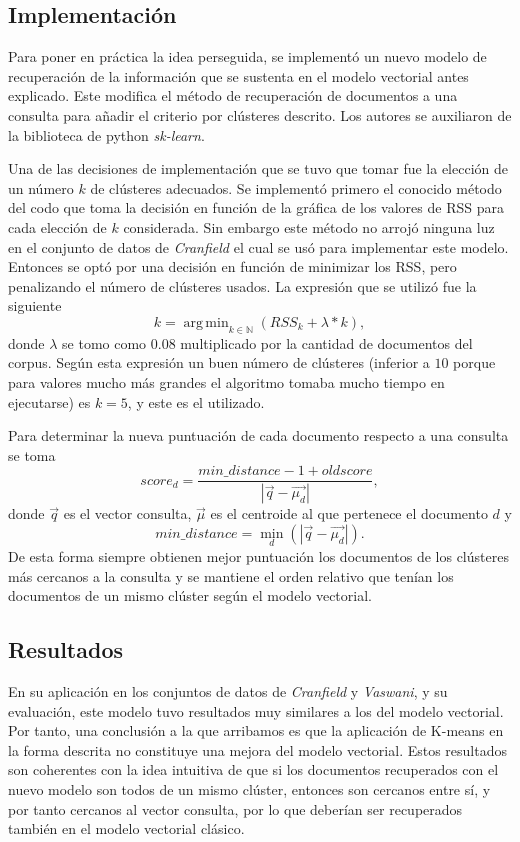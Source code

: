 \documentclass{llncs}
\DeclareMathOperator*{\argmin}{arg\,min}
\begin{document}
	\subsection{Implementaci\'on}
	Para poner en pr\'actica la idea perseguida, se implement\'o un nuevo modelo de recuperaci\'on de la informaci\'on que se sustenta en el modelo vectorial antes explicado. Este modifica el m\'etodo de recuperaci\'on de documentos a una consulta para a\~nadir el criterio por cl\'usteres descrito. Los autores se auxiliaron de la biblioteca de python \emph{sk-learn}.

	 Una de las decisiones de implementaci\'on que se tuvo que tomar fue la elecci\'on de un n\'umero $k$ de cl\'usteres adecuados. Se implement\'o primero el conocido m\'etodo del codo que toma la decisi\'on en funci\'on de la gr\'afica de los valores de RSS para cada elecci\'on de $k$ considerada. Sin embargo este m\'etodo no arroj\'o ninguna luz en el conjunto de datos de \emph{Cranfield} el cual se us\'o para implementar este modelo. Entonces se opt\'o por una decisi\'on en funci\'on de minimizar los RSS, pero penalizando el n\'umero de cl\'usteres usados. La expresi\'on que se utiliz\'o fue la siguiente
	 \[
		k = \argmin_{k \in \mathbb{N}} (RSS_k + \lambda * k),
	 \]
	 donde $\lambda$ se tomo como $0.08$ multiplicado por la cantidad de documentos del corpus. Seg\'un esta expresi\'on un buen n\'umero de cl\'usteres (inferior a $10$ porque para valores mucho m\'as grandes el algoritmo tomaba mucho tiempo en ejecutarse) es $k=5$, y este es el utilizado.
	 
	 Para determinar la nueva puntuaci\'on de cada documento respecto a una consulta se toma 
	 \[score_d =  \frac{min\_distance - 1 + oldscore}{|\overrightarrow{q} - \overrightarrow{\mu_d}|},\]
	 donde $\overrightarrow{q}$ es el vector consulta, $\overrightarrow{\mu}$ es el centroide al que pertenece el documento $d$ y
	 \[ min\_distance = \min_{d}(|\overrightarrow{q} - \overrightarrow{\mu_d}|).\]
	 De esta forma siempre obtienen mejor puntuaci\'on los documentos de los cl\'usteres m\'as cercanos a la consulta y se mantiene el orden relativo que ten\'ian los documentos de un mismo cl\'uster seg\'un el modelo vectorial.
	 
	 \subsection{Resultados}
	 
	 En su aplicaci\'on en los conjuntos de datos de \emph{Cranfield} y \emph{Vaswani}, y su evaluaci\'on, este modelo tuvo resultados muy similares a los del modelo vectorial. Por tanto, una conclusi\'on a la que arribamos es que la aplicaci\'on de K-means en la forma descrita no constituye una mejora del modelo vectorial. Estos resultados son coherentes con la idea intuitiva de que si los documentos recuperados con el nuevo modelo son todos de un mismo cl\'uster, entonces son cercanos entre s\'i, y por tanto cercanos al vector consulta, por lo que deber\'ian ser recuperados tambi\'en en el modelo vectorial cl\'asico.
	 
\end{document}
